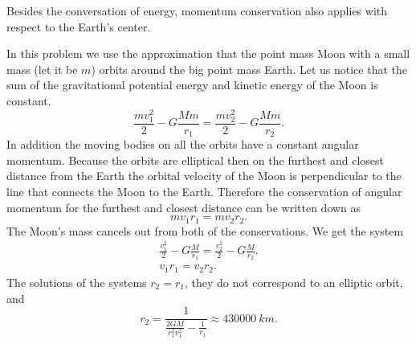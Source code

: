{\ifEngHint
Besides the conversation of energy, momentum conservation also applies with respect to the Earth’s center.
\fi


\ifEngSolution
In this problem we use the approximation that the point mass Moon with a small mass (let it be $m$) orbits around the big point mass Earth. Let us notice that the sum of the gravitational potential energy and kinetic energy of the Moon is constant. 
$$
\frac{mv_1^2}{2}-G\frac{Mm}{r_1}=\frac{mv_2^2}{2}-G\frac{Mm}{r_2}.
$$
In addition the moving bodies on all the orbits have a constant angular momentum. Because the orbits are elliptical then on the furthest and closest distance from the Earth the orbital velocity of the Moon is perpendicular to the line that connects the Moon to the Earth. Therefore the conservation of angular momentum for the furthest and closest distance can be written down as
$$
mv_1r_1=mv_2r_2.
$$
The Moon’s mass cancels out from both of the conservations. We get the system
$$
\begin{array}{c} 
\frac{v_1^2}{2}-G\frac{M}{r_1}=\frac{v_2^2}{2}-G\frac{M}{r_2}.\\
v_1r_1=v_2r_2.
\end{array}
$$
The solutions of the systems $r_2=r_1$, they do not correspond to an elliptic orbit, and
$$r_2=\frac{1}{\frac{2GM}{r_1^2v_1^2}-\frac{1}{r_1}}\approx\SI{430000}{km}.$$
\fi
}